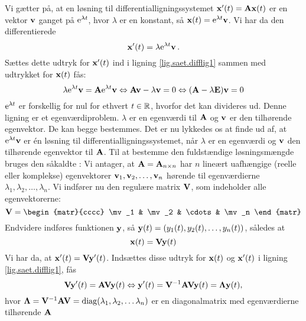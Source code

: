 \begin{bevis} \label{bev.diffsys.egnv1}
Vi gætter på, at en løsning til differentialligningssystemet $ \mathbf{x}'(t) = \mathbf{A} \mathbf{x}(t) $ er en vektor $ \mathbf{v} $ ganget på $ \mathrm{e}^{\lambda t} $, hvor $ \lambda $ er en konstant, så $ \mathbf{x}(t) = \mathrm{e}^{\lambda t} \mathbf{v} $. Vi har da den differentierede
\begin{equation} 
\mathbf{x}'(t) = \lambda \mathrm{e}^{\lambda t} \mathbf{v} \,.
\end{equation}
Sættes dette udtryk for $ \mathbf{x}'(t) $ ind i ligning \eqref{lig.saet.difflig1} sammen med udtrykket for $ \mathbf{x}(t) $ fås:
\begin{equation} 
\lambda \mathrm{e}^{\lambda t} \mathbf{v} = \mathbf{A} \mathrm{e}^{\lambda t} \mathbf{v} \Leftrightarrow  \mathbf{A} \mathbf{v} - \lambda \mathbf{v} = 0 \Leftrightarrow (\mathbf{A} - \lambda \mathbf{E}) \mathbf{v} = 0 
\end{equation}
$ \mathrm{e}^{\lambda t} $ er forskellig for nul for ethvert $ t \in \mathbb{R} $, hvorfor det kan divideres ud. Denne ligning er et egenværdiproblem. %
$ \lambda $ er en egenværdi til $ \mathbf{A} $ og $ \mathbf{v} $ er den tilhørende egenvektor. De kan begge bestemmes.
Det er nu lykkedes os at finde ud af, at $ \mathrm{e}^{\lambda t} \mathbf{v} $ er én løsning til differentialligningssystemet, når $ \lambda $ er en egenværdi og $ \mathbf{v} $ den tilhørende egenvektor til $ \mathbf{A} $. \bs
Til at bestemme den fuldstændige løsningsmængde bruges den såkaldte : \bs
Vi antager, at $ \mathbf{A} = \mathbf{A}_{n \times n} $ har $ n $ lineært uafhængige (reelle eller komplekse) egenvektorer $ \mathbf{v}_1, \mathbf{v}_2, \ldots, \mathbf{v}_n $ hørende til egenværdierne $ \lambda_1, \lambda_2, \ldots, \lambda_n $. Vi indfører nu den regulære matrix $ \mathbf{V} $, som indeholder alle egenvektorerne:
\begin{equation} 
\mV = \begin{matr}{cccc} \mv_1 & \mv_2 & \cdots & \mv_n \end{matr}
\end{equation}
Endvidere indføres funktionen $ \mathbf{y} $, så $ \mathbf{y}(t) = ( y_1(t), y_2(t), \ldots, y_n(t) ) $, således at
\begin{equation} 
\mathbf{x}(t) = \mathbf{V} \mathbf{y}(t)
\end{equation} 
Vi har da, at $ \mathbf{x}'(t) = \mathbf{V} \mathbf{y}'(t) $. Indsættes disse udtryk for $ \mathbf{x}(t) $ og $ \mathbf{x}'(t) $ i ligning \eqref{lig.saet.difflig1}, fås
\begin{equation} 
\mathbf{V} \mathbf{y}'(t) = \mathbf{A} \mathbf{V} \mathbf{y}(t) \Leftrightarrow \mathbf{y}'(t) = \mathbf{V}^{-1} \mathbf{A} \mathbf{V} \mathbf{y}(t) = \bm{\Lambda} \mathbf{y}(t), 
\end{equation}
hvor $ \bm{\Lambda} = \mathbf{V}^{-1} \mathbf{A} \mathbf{V} = \mathrm{diag}(\lambda_1, \lambda_2, \ldots \lambda_n) $ er en diagonalmatrix med egenværdierne tilhørende $ \mathbf{A} $ %

\end{bevis}
